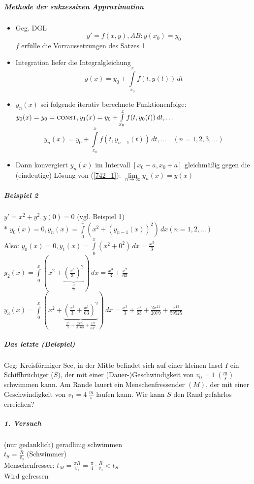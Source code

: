 \documentclass[a4paper]{scrartcl}
\begin{document}
\subparagraph{Methode der sukzessiven Approximation}
\begin{itemize}
\item Geg. DGL \begin{equation}\label{742_1} y' = f(x,y), AB: y(x_0)  = y_0 \end{equation} $f$ erfülle die Vorraussetzungen des Satzes 1
\item Integration liefer die Integralgleichung
\[ y(x) = y_0 + \int\limits_{x_0}^{x} f(t,y(t)) \, dt \]
\item $y_n (x)$ sei folgende iterativ berechnete Funktionenfolge:\\
$y_0(x)= y_0 = \textsc{const},y_1 (x) = y_0 + \int\limits_{x_0}^{x} f(t,y_0(t)) \, dt,\dots$\\
\[ y_n (x) = y_0 + \int\limits_{x_0}^{x} f(t,y_{n-1} (t))\, dt, \dots \quad (n = 1,2,3,\dots)\]
\item Dann konvergiert $y_n(x)$ im Intervall $[x_0 - a, x_0 + a ]$ gleichmäßig gegen die (eindeutige) Lösung von (\ref{742_1}): $\lim\limits_{n \to \infty} y_n (x) = y(x)$
\end{itemize}

\subparagraph{Beispiel 2} $y'=x^2 + y^2, y(0) = 0$ (vgl. Beispiel 1)\\*
$y_0 (x) = 0,y_n(x) = \int\limits_0^x (x^2 + (y_{n-1} (x))^2 )\, dx (n=1,2,\dots)$\\
Also: $y_0(x)= 0 , y_1(x) = \int\limits_{0}^{x} (x^2 + 0^2) \, dx = \frac{x^3}{3}$\\
$y_2 (x) = \int\limits_0^x (x^2 + \underbrace{(\frac{x^3}{3})^2}_{\frac{x^6}{9}} ) \, dx = \frac{x^3}{3} + \frac{x^7}{63}$\\
$y_3(x) = \int\limits_{0}^x (x^2 + \underbrace{(\frac{x^3}{3} + \frac{x^7}{63} )^2}_{\frac{x^6}{9} + \frac{2x^10}{3 \cdot 63} + \frac{x^{14}}{63^2}} )\, dx = \frac{x^3}{3} + \frac{x^7}{63} + \frac{2x^{11}}{2079} + \frac{x^{15}}{59525}$

\subparagraph{Das letzte (Beispiel)} Geg: Kreisförmiger See, in der Mitte befindet sich auf einer kleinen Insel $I$ ein Schiffbrüchiger ($S$), der mit einer (Dauer-)Geschwindigkeit von $v_0 = 1 \; (\frac{m}{s})$ schwimmen kann. Am Rande lauert ein Menschenfressender $(M)$, der mit einer Geschwindigkeit von $v_1 = 4 \; \frac{m}{s}$ laufen kann. Wie kann $S$ den Rand gefahrlos erreichen?
\subparagraph{1. Versuch} (nur gedanklich) geradlinig schwimmen\\
$t_S = \frac{R}{v_0}$ (Schwimmer)\\
Menschenfresser: $t_M = \frac{\pi R}{v_1} = \frac{\pi}{4} \cdot \frac{R}{v_0} < t_S$\\
Wird gefressen
\end{document}
